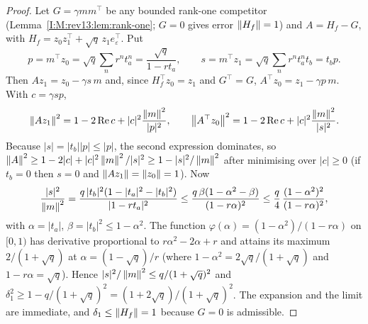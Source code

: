 \begin{proof}
Let $G=\gamma mm^{\top}$ be any bounded rank-one competitor (Lemma~\ref{I:M:rev13:lem:rank-one};
$G=0$ gives error $\left\lVert H_f\right\rVert=1$) and $A=H_f-G$, with
$H_f=z_0z_1^{\top}+\sqrt q\,z_1e_\varepsilon^{\top}$. Put
\[
p=m^{\top}z_0=\sqrt q\sum_nr^nt_a^n=\frac{\sqrt q}{1-rt_a},\qquad
s=m^{\top}z_1=\sqrt q\sum_nr^nt_a^nt_b=t_bp .
\]
Then $Az_1=z_0-\gamma s\,m$ and, since $H_f^{\top}z_0=z_1$ and $G^{\top}=G$,
$A^{\top}z_0=z_1-\gamma p\,m$. With $c=\gamma sp$,
\[
\left\lVert Az_1\right\rVert^2=1-2\operatorname{Re}c+|c|^2\frac{\left\lVert m\right\rVert^2}{|p|^2},\qquad
\left\lVert A^{\top}z_0\right\rVert^2=1-2\operatorname{Re}c+|c|^2\frac{\left\lVert m\right\rVert^2}{|s|^2}.
\]
Because $|s|=|t_b||p|\le|p|$, the second expression dominates, so
$\left\lVert A\right\rVert^2\ge1-2|c|+|c|^2\left\lVert m\right\rVert^2/|s|^2\ge1-|s|^2/\left\lVert m\right\rVert^2$ after minimising over
$|c|\ge0$ (if $t_b=0$ then $s=0$ and $\left\lVert Az_1\right\rVert=\left\lVert z_0\right\rVert=1$). Now
\[
\frac{|s|^2}{\left\lVert m\right\rVert^2}=\frac{q\,|t_b|^2(1-|t_a|^2-|t_b|^2)}{|1-rt_a|^2}
\le\frac{q\,\beta(1-\alpha^2-\beta)}{(1-r\alpha)^2}\le\frac q4\,\frac{(1-\alpha^2)^2}{(1-r\alpha)^2},
\]
with $\alpha=|t_a|$, $\beta=|t_b|^2\le1-\alpha^2$. The function
$\varphi(\alpha)=(1-\alpha^2)/(1-r\alpha)$ on $[0,1)$ has derivative proportional to
$r\alpha^2-2\alpha+r$ and attains its maximum $2/(1+\sqrt q)$ at
$\alpha=(1-\sqrt q)/r$ (where $1-\alpha^2=2\sqrt q/(1+\sqrt q)$ and $1-r\alpha=\sqrt q$).
Hence $|s|^2/\left\lVert m\right\rVert^2\le q/(1+\sqrt q)^2$ and
$\delta_1^2\ge1-q/(1+\sqrt q)^2=(1+2\sqrt q)/(1+\sqrt q)^2$. The expansion and the limit
are immediate, and $\delta_1\le\left\lVert H_f\right\rVert=1$ because $G=0$ is admissible.
\end{proof}
